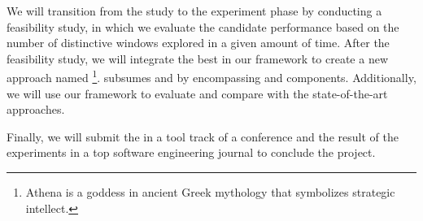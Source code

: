 \smallskip
We will transition from the study to the experiment phase by  conducting a feasibility study, in which we evaluate the candidate \rlaganets performance based on the number of distinctive windows  explored in a given amount of time. 
After the feasibility study, we will  integrate the best \rlaganet in our framework to create a new \testreuse approach named \rltool\footnote{Athena is a goddess in ancient Greek mythology that symbolizes strategic intellect.
}.
\rltool subsumes \visiontool and \llmtool by  encompassing \imagelabeler and \llmtranslator components.
Additionally, we will use our \tme framework to evaluate \rltool and compare with the state-of-the-art \testreuse approaches.

\smallskip
Finally, we will submit the \rltool in a tool track of a conference and the result of the \testreuse experiments in a top software  engineering journal to conclude the project. 
















